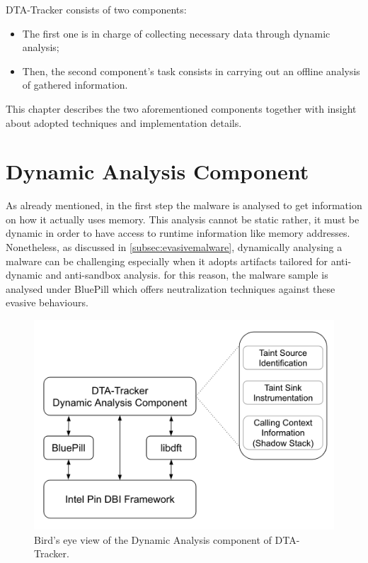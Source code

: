 \documentclass[LaM,binding=0.6cm]{sapthesis}
\begin{document}
DTA-Tracker consists of two components: 
\begin{itemize}
\item The first one is in charge of collecting necessary data through dynamic analysis;
\item Then, the second component's task consists in carrying out an offline analysis of gathered information.
\end{itemize}
This chapter describes the two aforementioned components together with insight about adopted techniques and implementation details.

\section{Dynamic Analysis Component}
As already mentioned, in the first step the malware is analysed to get information on how it actually uses memory. This analysis cannot be static rather, it must be dynamic in order to have access to runtime information like memory addresses.\\
Nonetheless, as discussed in \autoref{subsec:evasivemalware}, dynamically analysing a malware can be challenging especially when it adopts artifacts tailored for anti-dynamic and anti-sandbox analysis. for this reason, the malware sample is analysed under BluePill which offers neutralization techniques against these evasive behaviours.

\begin{figure}[h!]
\centering
\includegraphics[scale=.6]{images/dtatracker1}
\caption{Bird's eye view of the Dynamic Analysis component of DTA-Tracker.}
\end{figure}
\newpage
\end{document}
